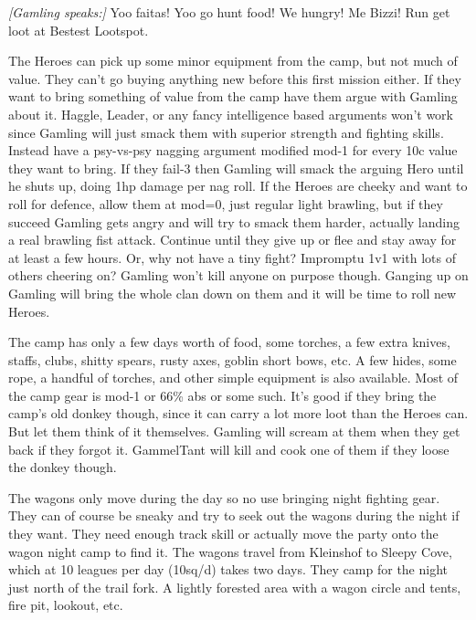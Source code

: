 \begin{readoutloud}
\emph{[Gamling speaks:]}
Yoo faitas! Yoo go hunt food! We hungry! Me Bizzi! Run get loot at Bestest Lootspot.
\end{readoutloud}

\noindent The Heroes can pick up some minor equipment from the camp, but not much of value. They can't go buying anything new before this first mission either. If they want to bring something of value from the camp have them argue with Gamling about it. Haggle, Leader, or any fancy intelligence based arguments won't work since Gamling will just smack them with superior strength and fighting skills. Instead have a psy-vs-psy nagging argument modified mod-1 for every 10c value they want to bring. If they fail-3 then Gamling will smack the arguing Hero until he shuts up, doing 1hp damage per nag roll. If the Heroes are cheeky and want to roll for defence, allow them at mod=0, just regular light brawling, but if they succeed Gamling gets angry and will try to smack them harder, actually landing a real brawling fist attack. Continue until they give up or flee and stay away for at least a few hours. Or, why not have a tiny fight? Impromptu 1v1 with lots of others cheering on? Gamling won't kill anyone on purpose though. Ganging up on Gamling will bring the whole clan down on them and it will be time to roll new Heroes.

The camp has only a few days worth of food, some torches, a few extra knives, staffs, clubs, shitty spears, rusty axes, goblin short bows, etc. A few hides, some rope, a handful of torches, and other simple equipment is also available. Most of the camp gear is mod-1 or 66\% abs or some such. It's good if they bring the camp's old donkey though, since it can carry a lot more loot than the Heroes can. But let them think of it themselves. Gamling will scream at them when they get back if they forgot it. GammelTant will kill and cook one of them if they loose the donkey though.

The wagons only move during the day so no use bringing night fighting gear. They can of course be sneaky and try to seek out the wagons during the night if they want. They need enough track skill or actually move the party onto the wagon night camp to find it. The wagons travel from Kleinshof to Sleepy Cove, which at 10 leagues per day (10sq/d) takes two days. They camp for the night just north of the trail fork. A lightly forested area with a wagon circle and tents, fire pit, lookout, etc.

